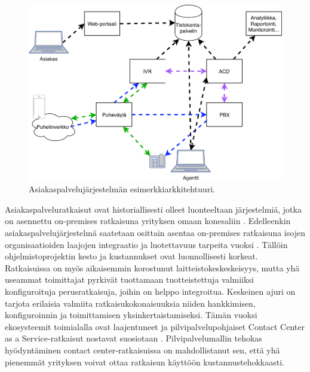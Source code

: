 \documentclass[finnish,12pt,a4paper,pdftex]{article}
\begin{document}
\begin{figure}[!h]
    \centering
    \includegraphics[scale=0.6]{images/ccarkh2.pdf}
    \caption{Asiakaspalvelujärjestelmän esimerkkiarkkitehtuuri. \citep{webrtc}}
    \label{fig:ccarkt}
\end{figure}


Asiakaspalveluratkaisut ovat historiallisesti olleet luonteeltaan järjestelmiä, jotka on asennettu on-premises ratkaisuna yrityksen omaan konesaliin \citep{vcc}. Edelleenkin asiakaspalvelujärjestelmä saatetaan osittain asentaa on-premises ratkaisuna isojen organisaatioiden laajojen integraatio ja luotettavuus tarpeita vuoksi \citep{cisco}. Tällöin ohjelmistoprojektin kesto ja kustannukset ovat luonnollisesti korkeat. Ratkaisuissa on myös aikaisemmin korostunut laitteistokeskeskeisyys, mutta yhä useammat toimittajat pyrkivät tuottamaan tuotteistettuja valmiiksi konfiguroituja perusratkaisuja, joihin on helppo integroitua. Keskeinen ajuri on tarjota erilaisia valmiita ratkaisukokonaisuuksia niiden hankkimisen, konfiguroinnin ja toimittamisen yksinkertaistamiseksi. Tämän vuoksi ekosysteemit toimialalla ovat laajentuneet ja pilvipalvelupohjaiset Contact Center as a Service-ratkaisut nostavat suosiotaan \citep{ccinfo}. Pilvipalvelumallin tehokas hyödyntäminen contact center-ratkaisuissa on mahdollistanut sen, että yhä pienemmät yrityksen voivat ottaa ratkaisun käyttöön kustannustehokkaasti.  \\
\end{document}
